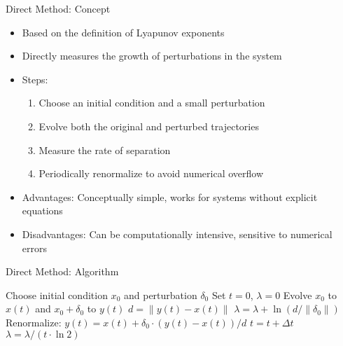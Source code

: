 \documentclass{beamer}
\begin{document}
\begin{frame}{Direct Method: Concept}
\begin{itemize}
    \item Based on the definition of Lyapunov exponents
    \item Directly measures the growth of perturbations in the system
    \item Steps:
    \begin{enumerate}
        \item Choose an initial condition and a small perturbation
        \item Evolve both the original and perturbed trajectories
        \item Measure the rate of separation
        \item Periodically renormalize to avoid numerical overflow
    \end{enumerate}
    \item Advantages: Conceptually simple, works for systems without explicit equations
    \item Disadvantages: Can be computationally intensive, sensitive to numerical errors
\end{itemize}
\end{frame}

\begin{frame}{Direct Method: Algorithm}
\begin{algorithm}[H]
\caption{Direct Method for Largest Lyapunov Exponent}
\begin{algorithmic}[1]
\State Choose initial condition $x_0$ and perturbation $\delta_0$
\State Set $t = 0$, $\lambda = 0$
    \State Evolve $x_0$ to $x(t)$ and $x_0 + \delta_0$ to $y(t)$
    \State $d = \|y(t) - x(t)\|$
    \State $\lambda = \lambda + \ln(d/\|\delta_0\|)$
    \State Renormalize: $y(t) = x(t) + \delta_0 \cdot (y(t) - x(t))/d$
    \State $t = t + \Delta t$
\EndWhile
\State $\lambda = \lambda / (t \cdot \ln 2)$
\end{algorithmic}
\end{algorithm}
\end{frame}
\end{document}
